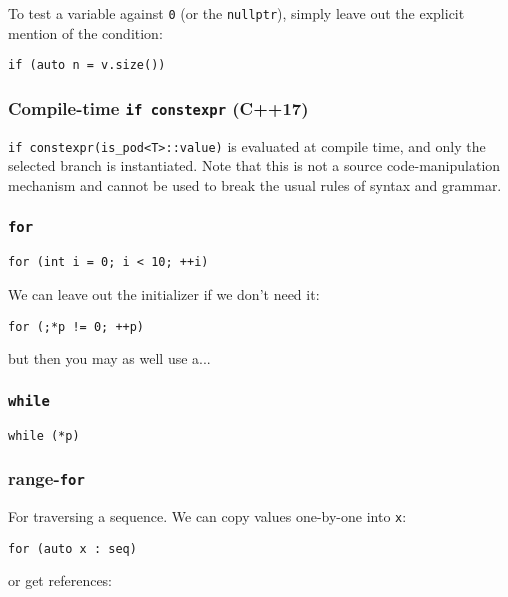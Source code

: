 \documentclass[8pt, table, xcdraw]{article}%
\begin{document}
To test a variable against \lstinline{0} (or the \lstinline{nullptr}), simply leave out the explicit mention of the condition:

\begin{lstlisting}
if (auto n = v.size())
\end{lstlisting}

\subsubsection{Compile-time \lstinline{if constexpr} (C++17)}

\lstinline{if constexpr(is_pod<T>::value)} is evaluated at compile time, and only the selected branch is instantiated. Note that this is not a source code-manipulation mechanism and cannot be used to break the usual rules of syntax and grammar.

\subsubsection{\lstinline{for}}

\begin{lstlisting}
for (int i = 0; i < 10; ++i)
\end{lstlisting}

We can leave out the initializer if we don't need it:

\begin{lstlisting}
for (;*p != 0; ++p)
\end{lstlisting}

but then you may as well use a...

\subsubsection{\lstinline{while}}

\begin{lstlisting}
while (*p)
\end{lstlisting}

\subsubsection{range-\lstinline{for}}
For traversing a sequence. We can copy values one-by-one into \lstinline{x}:

\begin{lstlisting}
for (auto x : seq)
\end{lstlisting}

or get references:
\end{document}
